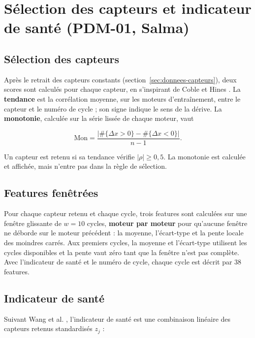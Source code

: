 \section{Sélection des capteurs et indicateur de santé (PDM-01, Salma)}\label{sec:hi}

\subsection{Sélection des capteurs}

Après le retrait des capteurs constants (section~\ref{sec:donnees-capteurs}), deux scores sont calculés pour chaque capteur, en s'inspirant de Coble et Hines \cite{coble2009}. La \textbf{tendance} est la corrélation moyenne, sur les moteurs d'entraînement, entre le capteur et le numéro de cycle ; son signe indique le sens de la dérive. La \textbf{monotonie}, calculée sur la série lissée de chaque moteur, vaut

\begin{equation}\label{eq:monotonie}
\mathrm{Mon} = \frac{\big|\#\{\Delta x > 0\} - \#\{\Delta x < 0\}\big|}{n - 1}.
\end{equation}

Un capteur est retenu si sa tendance vérifie $|\rho| \ge 0{,}5$. La monotonie est calculée et affichée, mais n'entre pas dans la règle de sélection.

\subsection{Features fenêtrées}

Pour chaque capteur retenu et chaque cycle, trois features sont calculées sur une fenêtre glissante de $w = 10$ cycles, \textbf{moteur par moteur} pour qu'aucune fenêtre ne déborde sur le moteur précédent : la moyenne, l'écart-type et la pente locale des moindres carrés. Aux premiers cycles, la moyenne et l'écart-type utilisent les cycles disponibles et la pente vaut zéro tant que la fenêtre n'est pas complète. Avec l'indicateur de santé et le numéro de cycle, chaque cycle est décrit par 38 features.

\subsection{Indicateur de santé}

Suivant Wang et al. \cite{wang2008}, l'indicateur de santé est une combinaison linéaire des capteurs retenus standardisés $z_j$ :

